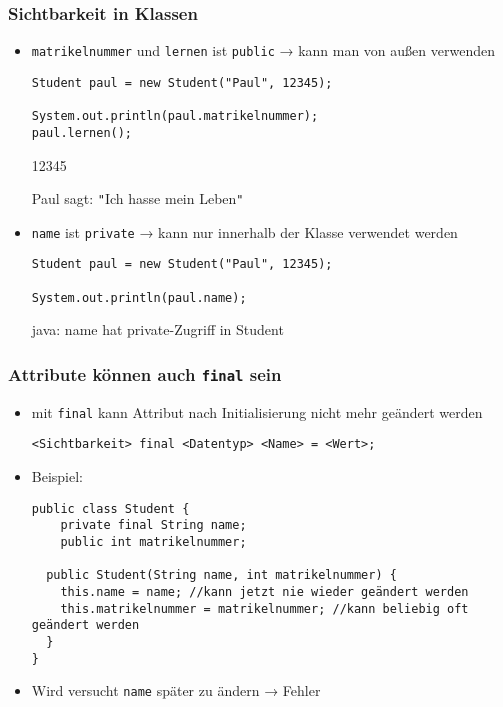 \documentclass{../../presentation}
\begin{document}
\begin{frame}[fragile]
	\frametitle{Sichtbarkeit in Klassen}
	\pause
	\begin{itemize}
		\item\texttt{matrikelnummer} und \texttt{lernen} ist \texttt{public} → kann man von außen verwenden
		      \begin{verbatim}
Student paul = new Student("Paul", 12345);

System.out.println(paul.matrikelnummer);
paul.lernen();
  \end{verbatim}
		      \pause
		      {\begin{ausgabe}
				      12345


				      Paul sagt: \texttt{"}Ich hasse mein Leben\texttt{"}
			      \end{ausgabe}}
		      \pause
		\item \texttt{name} ist \texttt{private} → kann nur innerhalb der Klasse verwendet werden
		      \begin{verbatim}
Student paul = new Student("Paul", 12345);

System.out.println(paul.name);
  \end{verbatim}
		      \pause
		      \begin{ausgabe}
			      \alert{java: name hat private-Zugriff in Student}
		      \end{ausgabe}
	\end{itemize}
\end{frame}


\begin{frame}[fragile]
	\frametitle{Attribute können auch \texttt{final} sein}

	\begin{itemize}
		\item<2-> mit \texttt{final} kann Attribut nach Initialisierung nicht mehr geändert werden
		      \begin{verbatim}
<Sichtbarkeit> final <Datentyp> <Name> = <Wert>;
		\end{verbatim}
		\item<3-> Beispiel:
		      \begin{verbatim}
public class Student {
    private final String name;
    public int matrikelnummer;
    
  public Student(String name, int matrikelnummer) {
    this.name = name; //kann jetzt nie wieder geändert werden
    this.matrikelnummer = matrikelnummer; //kann beliebig oft geändert werden
  }
}
\end{verbatim}

		\item<4-> Wird versucht \texttt{name} später zu ändern → \alert{Fehler}
	\end{itemize}

\end{frame}
\end{document}
